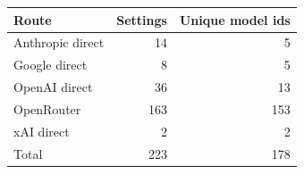 \footnotesize
\begin{tabularx}{\linewidth}{@{}Xrr@{}}
\toprule
Route & Settings & Unique model ids \\
\midrule
Anthropic direct & 14 & 5 \\
Google direct & 8 & 5 \\
OpenAI direct & 36 & 13 \\
OpenRouter & 163 & 153 \\
xAI direct & 2 & 2 \\
\midrule
Total & 223 & 178 \\
\bottomrule
\end{tabularx}
\normalsize
